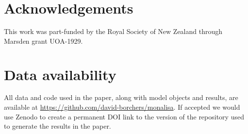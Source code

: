 \documentclass[useAMS,usenatbib,referee]{biom}
\begin{document}

\section*{Acknowledgements}

This work was part-funded by the Royal Society of New Zealand through Marsden grant UOA-1929.

%

\section*{Data availability}

All data and code used in the paper, along with model objects and results, are available at \url{https://github.com/david-borchers/monalisa}. If accepted we would use Zenodo to create a permanent DOI link to the version of the repository used to generate the results in the paper.




\end{document}
